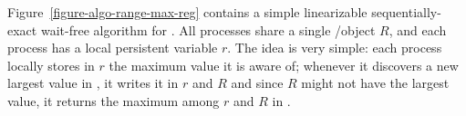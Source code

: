 Figure~\ref{figure-algo-range-max-reg} contains a simple linearizable sequentially-exact wait-free algorithm for \RangeMaxReg.  All processes share a single \R/\W object \(R\), and each process has a local persistent variable \(r\).  The idea is very simple: each process locally stores in \(r\) the maximum value it is aware of; whenever it discovers a new largest value in \RMaxW, it writes it in \(r\) and \(R\) and since \(R\) might not have the largest value, it returns the maximum among \(r\) and \(R\) in \RMaxR.


\begin{figure}[!ht]
\end{figure}

